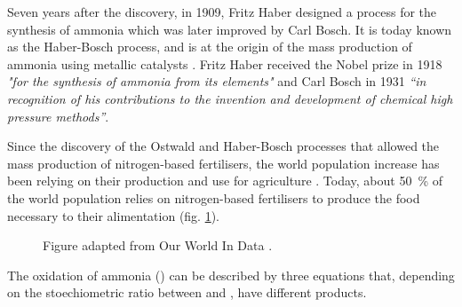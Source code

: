 Seven years after the discovery, in 1909, Fritz Haber designed a process for the synthesis of ammonia which was later improved by Carl Bosch.
It is today known as the Haber-Bosch process, and is at the origin of the mass production of ammonia using metallic catalysts \parencite{Hosmer1917, Parsons1919}.
Fritz Haber received the Nobel prize in 1918 \textit{"for the synthesis of ammonia from its elements"} \parencite{Alexander1920} and Carl Bosch in 1931 \textit{“in recognition of his contributions to the invention and development of chemical high pressure methods”}.

Since the discovery of the Ostwald and Haber-Bosch processes that allowed the mass production of nitrogen-based fertilisers, the world population increase has been relying on their production and use for agriculture \parencite{Erisman2008}.
Today, about \qty{50}{\percent} of the world population relies on nitrogen-based fertilisers to produce the food necessary to their alimentation (fig. \ref{fig:FertilizerWID}).

\begin{figure}[!htb]
\centering
    \caption{
    Figure adapted from Our World In Data \parencite{WorldDataFertilizer}.
    }
    \label{fig:FertilizerWID}
\end{figure}

The oxidation of ammonia () can be described by three equations that, depending on the stoechiometric ratio between  and , have different products.

